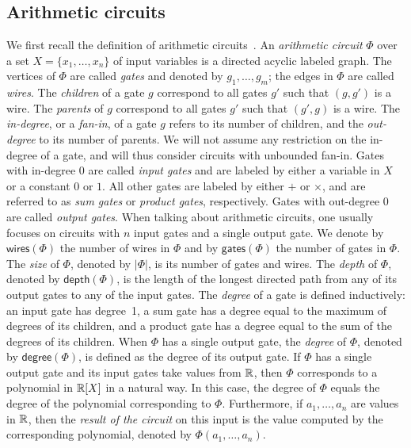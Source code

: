\subsection{Arithmetic circuits}\label{subsect:ac}
We first recall the definition of arithmetic circuits~\cite{allender}. 
An \textit{arithmetic circuit} $\Phi$ over a set $X=\{x_1,\ldots,x_n\}$ of input variables is a directed
acyclic labeled graph. The vertices of $\Phi$ are called \textit{gates} and denoted by $g_1,\ldots,g_m$;
the edges in $\Phi$ are called \textit{wires}. The \textit{children} of a gate $g$ correspond to all gates
$g'$ such that $(g,g')$ is a wire. The \textit{parents} of $g$ correspond to all gates $g'$ 
such that $(g',g)$ is a wire. The \textit{in-degree}, or a \textit{fan-in}, of a gate $g$ refers to its number of 
children, and 
the \textit{out-degree} to its number of parents. We will not assume any restriction on the in-degree of a gate, and will thus consider circuits with unbounded fan-in. Gates with in-degree $0$ are called \textit{input gates}
and are labeled by either a variable in $X$ or a constant $0$ or $1$. All other gates
are labeled by either $+$ or $\times$, and are referred to as \textit{sum gates} or \textit{product gates}, respectively.
Gates with out-degree $0$ are called \textit{output gates}. When talking about arithmetic circuits, one usually focuses on circuits with $n$ input gates and a single output gate. We denote by $\mathsf{wires}(\Phi)$ the number of wires in $\Phi$ and by $\mathsf{gates}(\Phi)$ the number of gates in $\Phi$.
The \textit{size} of $\Phi$, denoted by $|\Phi|$, is its number of gates and wires. The \textit{depth} of $\Phi$, denoted
by $\mathsf{depth}(\Phi)$, is the length of the longest directed path from any of its output gates to any of the input gates. The \textit{degree} of a gate is defined inductively: an input gate has degree~1, a sum gate has a degree equal to the maximum of degrees of its children, and a product gate has a degree equal to the sum of the degrees of its children. When $\Phi$ has a single output gate, the \textit{degree} of $\Phi$, denoted by $\mathsf{degree}(\Phi)$, is defined as the degree of its output gate. If $\Phi$ has a single output gate and its input gates take values from $\mathbb{R}$, then $\Phi$ corresponds to a polynomial in $\mathbb{R}[X]$ in a natural way. In this case, the {degree} of $\Phi$ equals the degree of the polynomial corresponding to $\Phi$. Furthermore, if $a_1,\ldots ,a_n$ are values in $\mathbb{R}$, then 
the \textit{result of the circuit} on this input is the value computed by the corresponding polynomial, denoted by $\Phi(a_1,\ldots ,a_n)$.

